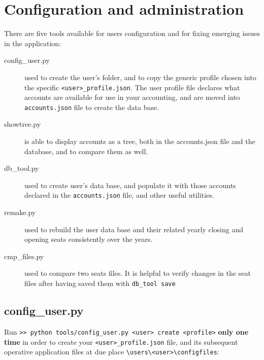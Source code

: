 \documentclass[12pt, a4paper]{article}
\begin{document}
 \section{Configuration and administration }
 There are five  tools available for users configuration and for fixing emerging issues in the application:
 
 \begin{description}
 \item[config\_user.py] used to create the user's folder, and to copy the generic profile chosen into the specific \verb!<user>_profile.json!.
   The user profile file declares what accounts are available for use in your accounting, and are moved into \verb!accounts.json! file to create the data base.
 \item[showtree.py] is able to display accounts as a tree, both in the accounts.json file and the database, and to compare them as well.
 \item[db\_tool.py] used to create user's data base, and populate it with those accounts declared in the \verb!accounts.json! file, and other useful utilities.
  \item[remake.py] used to rebuild the user data base and their  related yearly closing and opening seats consistently over the years. 
 \item[cmp\_files.py] used to compare two seats files. It is helpful to verify changes in the seat files after having saved them with \verb!db_tool save!
 \end{description}
 
 \subsection{config\_user.py}
 Run \verb!>> python tools/config_user.py <user> create <profile>! \textbf{only one time} in order to create your \verb!<user>_profile.json! file, and its subsequent  operative application files at due place 
 \verb!\users\<user>\configfiles!:
\begin{figure}[h]
\centering
{}
 \end{figure}
  
\end{document}
